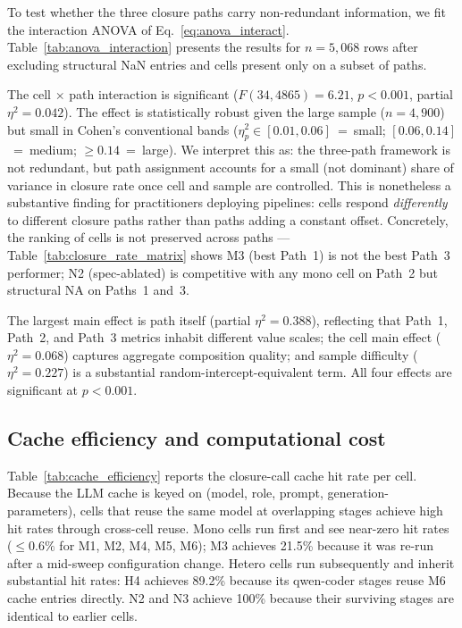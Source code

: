 

To test whether the three closure paths carry non-redundant information, we fit the interaction ANOVA of Eq.~\ref{eq:anova_interact}. Table~\ref{tab:anova_interaction} presents the results for $n = 5{,}068$ rows after excluding structural NaN entries and cells present only on a subset of paths.

The cell $\times$ path interaction is significant ($F(34, 4865) = 6.21$, $p < 0.001$, partial $\eta^2 = 0.042$). The effect is statistically robust given the large sample ($n = 4{,}900$) but small in Cohen's conventional bands ($\eta^2_p \in [0.01, 0.06]$~=~small; $[0.06, 0.14]$~=~medium; $\geq 0.14$~=~large). We interpret this as: the three-path framework is not redundant, but path assignment accounts for a small (not dominant) share of variance in closure rate once cell and sample are controlled. This is nonetheless a substantive finding for practitioners deploying pipelines: cells respond \emph{differently} to different closure paths rather than paths adding a constant offset. Concretely, the ranking of cells is not preserved across paths --- Table~\ref{tab:closure_rate_matrix} shows M3 (best Path~1) is not the best Path~3 performer; N2 (spec-ablated) is competitive with any mono cell on Path~2 but structural NA on Paths~1 and~3.

The largest main effect is path itself (partial $\eta^2 = 0.388$), reflecting that Path~1, Path~2, and Path~3 metrics inhabit different value scales; the cell main effect ($\eta^2 = 0.068$) captures aggregate composition quality; and sample difficulty ($\eta^2 = 0.227$) is a substantial random-intercept-equivalent term. All four effects are significant at $p < 0.001$.

\subsection{Cache efficiency and computational cost}



Table~\ref{tab:cache_efficiency} reports the closure-call cache hit rate per cell. Because the LLM cache is keyed on (model, role, prompt, generation-parameters), cells that reuse the same model at overlapping stages achieve high hit rates through cross-cell reuse. Mono cells run first and see near-zero hit rates ($\leq 0.6\%$ for M1, M2, M4, M5, M6); M3 achieves 21.5\% because it was re-run after a mid-sweep configuration change. Hetero cells run subsequently and inherit substantial hit rates: H4 achieves 89.2\% because its qwen-coder stages reuse M6 cache entries directly. N2 and N3 achieve 100\% because their surviving stages are identical to earlier cells.

